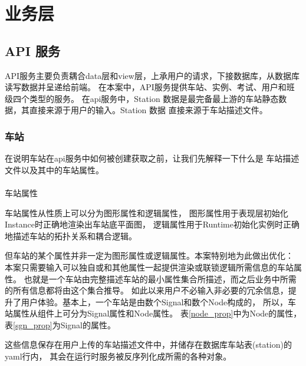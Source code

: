 \section{业务层}

\subsection{API 服务}
API服务主要负责耦合data层和view层，上承用户的请求，下接数据库，从数据库读写数据并呈递给前端。
在本案中，API服务提供车站、实例、考试、用户和班级四个类型的服务。
在api服务中，Station 数据是最完备最上游的车站静态数据，其直接来源于用户的输入。Station 数据
直接来源于车站描述文件。

\subsubsection{车站}

在说明车站在api服务中如何被创建获取之前，让我们先解释一下什么是
车站描述文件以及其中的车站属性。

\paragraph{}车站属性

车站属性从性质上可以分为图形属性和逻辑属性，
图形属性用于表现层初始化Instance时正确地渲染出车站底平面图，
逻辑属性用于Runtime初始化实例时正确地描述车站的拓扑关系和耦合逻辑。

但车站的某个属性并非一定为图形属性或逻辑属性。本案特别地为此做出优化：
本案只需要输入可以独自或和其他属性一起提供渲染或联锁逻辑所需信息的车站属性。
也就是一个车站由完整描述车站的最小属性集合所描述，而之后业务中所需的所有信息都将由这个集合推导。
如此以来用户不必输入非必要的冗余信息，提升了用户体验。基本上，一个车站是由数个Signal和数个Node构成的，
所以，车站属性从组件上可分为Signal属性和Node属性。
表\ref{node_prop}中为Node的属性，
表\ref{sgn_prop}为Signal的属性。

这些信息保存在用户上传的车站描述文件中，并储存在数据库车站表(station)的yaml行内，
其会在运行时服务被反序列化成所需的各种对象。

